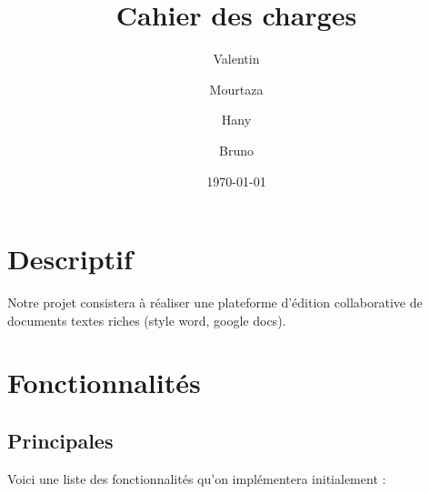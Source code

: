 

\author{Valentin }
\author{Mourtaza }
\author{Hany }
\author{Bruno }
\date{\today}
\title{Cahier des charges}


\maketitle

\newpage
\tableofcontents

\newpage

\section{Descriptif}

	Notre projet consistera à réaliser une plateforme d'édition collaborative de documents textes riches (style word, google docs).
	
\newpage


\section{Fonctionnalités}

	\subsection{Principales}
	Voici une liste des fonctionnalités qu'on implémentera initialement : \par
	
